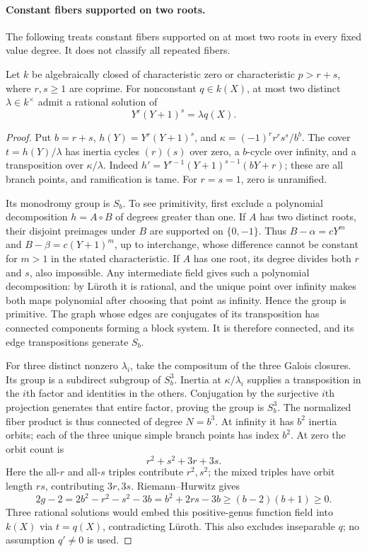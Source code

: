 \paragraph{Constant fibers supported on two roots.}
The following treats constant fibers supported on at most two roots in
every fixed value degree. It does not classify all repeated fibers.

\begin{lemma}
\label{lem:two-root-three-covers}
Let $k$ be algebraically closed of characteristic zero or characteristic
$p>r+s$, where $r,s\ge1$ are coprime. For nonconstant $q\in k(X)$,
at most two distinct $\lambda\in k^\times$ admit a rational solution of
\[
 Y^r(Y+1)^s=\lambda q(X).
\]
\end{lemma}
\begin{proof}
Put $b=r+s$, $h(Y)=Y^r(Y+1)^s$, and
$\kappa=(-1)^r r^rs^s/b^b$.
The cover $t=h(Y)/\lambda$ has inertia cycles $(r)(s)$ over zero,
a $b$-cycle over infinity, and a transposition over
$\kappa/\lambda$. Indeed
$h'=Y^{r-1}(Y+1)^{s-1}(bY+r)$; these are all branch points,
and ramification is tame. For $r=s=1$, zero is unramified.

Its monodromy group is $S_b$. To see primitivity, first exclude a
polynomial decomposition $h=A\circ B$ of degrees greater than one.
If $A$ has two distinct roots, their disjoint preimages under $B$
are supported on $\{0,-1\}$. Thus
$B-\alpha=cY^m$ and $B-\beta=c(Y+1)^m$, up to interchange,
whose difference cannot be constant for $m>1$ in the stated
characteristic. If $A$ has one root, its degree divides both $r$ and
$s$, also impossible. Any intermediate field gives such a polynomial
decomposition: by L\"uroth it is rational, and the unique point over
infinity makes both maps polynomial after choosing that point as
infinity. Hence the group is primitive. The graph whose edges are
conjugates of its transposition has connected components forming a
block system. It is therefore connected, and its edge transpositions
generate $S_b$.

For three distinct nonzero $\lambda_i$, take the compositum of the
three Galois closures. Its group is a subdirect subgroup of $S_b^3$.
Inertia at $\kappa/\lambda_i$ supplies a transposition in the $i$th
factor and identities in the others. Conjugation by the surjective
$i$th projection generates that entire factor, proving the group is
$S_b^3$. The normalized fiber product is thus connected of degree
$N=b^3$. At infinity it has $b^2$ inertia orbits; each of the three
unique simple branch points has index $b^2$. At zero the orbit count is
\[
 r^2+s^2+3r+3s.
\]
Here the all-$r$ and all-$s$ triples contribute $r^2,s^2$; the mixed
triples have orbit length $rs$, contributing $3r,3s$.
Riemann--Hurwitz gives
\[
 2g-2=2b^2-r^2-s^2-3b=b^2+2rs-3b
 \ge(b-2)(b+1)\ge0.
\]
Three rational solutions would embed this positive-genus function
field into $k(X)$ via $t=q(X)$, contradicting L\"uroth.
This also excludes inseparable $q$; no assumption $q'\ne0$ is used.
\end{proof}


